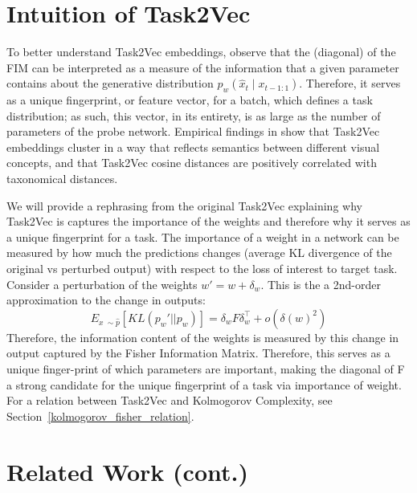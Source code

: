 \section{Intuition of Task2Vec}
\label{appendix:intuitiontask2vec}
To better understand Task2Vec embeddings, observe that the (diagonal) of the FIM can be interpreted as a measure of the information that a given parameter contains about the generative distribution $p_w(\hat x_t \mid x_{t-1:1})$. 
Therefore, it serves as a unique fingerprint, or feature vector, for a batch, which defines a task distribution; as such, this vector, in its entirety, is as large as the number of parameters of the probe network.
Empirical findings in \citep{task2vec} show that Task2Vec embeddings cluster in a way that reflects semantics between different visual concepts, and that Task2Vec cosine distances are positively correlated with taxonomical distances.

We will provide a rephrasing from the original Task2Vec \citep{task2vec} explaining why Task2Vec is captures the importance of the weights and therefore why it serves as a unique fingerprint for a task.
The importance of a weight in a network can be measured by how much the predictions changes (average KL divergence of the original vs perturbed output) with respect to the loss of interest to target task.
Consider a perturbation of the weights $w' = w + \delta_w$.
This is the a 2nd-order approximation to the change in outputs:
$$
E_{x ~\sim \hat{p}}[KL(p_w' || p_w)] = \delta_w F \delta_w^\top + o(\delta(w)^2)
$$
Therefore, the information content of the weights is measured by this change in output captured by the Fisher Information Matrix.
Therefore, this serves as a unique finger-print of which parameters are important, making the diagonal of F a strong candidate for the unique fingerprint of a task via importance of weight.
For a relation between Task2Vec and Kolmogorov Complexity, see Section~\ref{kolmogorov_fisher_relation}.

\section{Related Work (cont.)}\label{related_work_cont}


